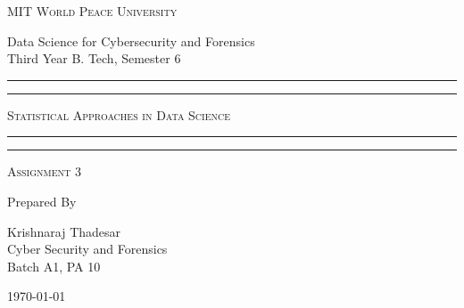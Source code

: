 \documentclass[11pt]{article}
\begin{document}
\begin{titlepage}
    \centering


    \huge\textsc{
        MIT World Peace University
    }\\

    \vspace{0.75\baselineskip} %

    \LARGE{
        Data Science for Cybersecurity and Forensics\\
        Third Year B. Tech, Semester 6
    }

    \vfill %


    \rule{\textwidth}{1.6pt}\vspace*{-\baselineskip}\vspace*{2pt}
    \rule{\textwidth}{0.6pt}
    \vspace{0.75\baselineskip} %



    \huge{\textsc{
            Statistical Approaches in Data Science
        }} \\



    \vspace{0.5\baselineskip} %
    \rule{\textwidth}{0.6pt}\vspace*{-\baselineskip}\vspace*{2.8pt}
    \rule{\textwidth}{1.6pt}

    \vspace{1\baselineskip} %


    \LARGE\textsc{
        Assignment 3
    } %
    \vfill


    Prepared By
    \vspace{0.5\baselineskip} %

    \Large{
        Krishnaraj Thadesar \\
        Cyber Security and Forensics\\
        Batch A1, PA 10
    }


    \vspace{0.5\baselineskip} %
    \today

\end{titlepage}
\end{document}
